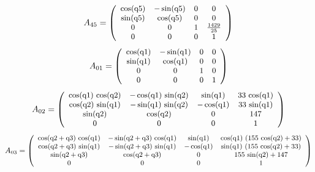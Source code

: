 \documentclass[fleqn, a4paper, 5pt, russian]{article}
\begin{document}
\begin{landscape}
\begin{equation}
\small{
	A_{45}=
	\left(\begin{array}{cccc} \cos\!\left(\mathrm{q5}\right) & - \sin\!\left(\mathrm{q5}\right) & 0 & 0\\ \sin\!\left(\mathrm{q5}\right) & \cos\!\left(\mathrm{q5}\right) & 0 & 0\\ 0 & 0 & 1 & \frac{1429}{25}\\ 0 & 0 & 0 & 1 \end{array}\right)
}\end{equation}
\begin{equation}
\small{
	A_{01}=
	\left(\begin{array}{cccc} \cos\!\left(\mathrm{q1}\right) & - \sin\!\left(\mathrm{q1}\right) & 0 & 0\\ \sin\!\left(\mathrm{q1}\right) & \cos\!\left(\mathrm{q1}\right) & 0 & 0\\ 0 & 0 & 1 & 0\\ 0 & 0 & 0 & 1 \end{array}\right)
}\end{equation}
\begin{equation}
\small{
	A_{02}=
	\left(\begin{array}{cccc} \cos\!\left(\mathrm{q1}\right)\, \cos\!\left(\mathrm{q2}\right) & - \cos\!\left(\mathrm{q1}\right)\, \sin\!\left(\mathrm{q2}\right) & \sin\!\left(\mathrm{q1}\right) & 33\, \cos\!\left(\mathrm{q1}\right)\\ \cos\!\left(\mathrm{q2}\right)\, \sin\!\left(\mathrm{q1}\right) & - \sin\!\left(\mathrm{q1}\right)\, \sin\!\left(\mathrm{q2}\right) & - \cos\!\left(\mathrm{q1}\right) & 33\, \sin\!\left(\mathrm{q1}\right)\\ \sin\!\left(\mathrm{q2}\right) & \cos\!\left(\mathrm{q2}\right) & 0 & 147\\ 0 & 0 & 0 & 1 \end{array}\right)
}\end{equation}
\begin{equation}
\small{
	A_{03}=
	\left(\begin{array}{cccc} \cos\!\left(\mathrm{q2} + \mathrm{q3}\right)\, \cos\!\left(\mathrm{q1}\right) & - \sin\!\left(\mathrm{q2} + \mathrm{q3}\right)\, \cos\!\left(\mathrm{q1}\right) & \sin\!\left(\mathrm{q1}\right) & \cos\!\left(\mathrm{q1}\right)\, \left(155\, \cos\!\left(\mathrm{q2}\right) + 33\right)\\ \cos\!\left(\mathrm{q2} + \mathrm{q3}\right)\, \sin\!\left(\mathrm{q1}\right) & - \sin\!\left(\mathrm{q2} + \mathrm{q3}\right)\, \sin\!\left(\mathrm{q1}\right) & - \cos\!\left(\mathrm{q1}\right) & \sin\!\left(\mathrm{q1}\right)\, \left(155\, \cos\!\left(\mathrm{q2}\right) + 33\right)\\ \sin\!\left(\mathrm{q2} + \mathrm{q3}\right) & \cos\!\left(\mathrm{q2} + \mathrm{q3}\right) & 0 & 155\, \sin\!\left(\mathrm{q2}\right) + 147\\ 0 & 0 & 0 & 1 \end{array}\right)
}
\end{equation}
\end{landscape}
\end{document}
